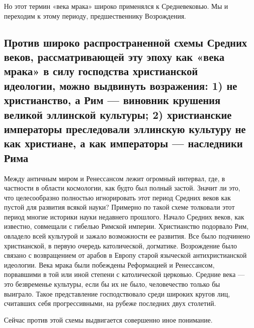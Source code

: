 Но этот  термин «века мрака»  широко применялся к Средневековью.  Мы и
переходим к этому периоду, предшественнику Возрождения.

\subsection{Против  широко   распространенной  схемы   Средних  веков,
рассматривающей  эту   эпоху  как  «века  мрака»   в  силу  господства
христианской   идеологии,   можно    выдвинуть   возражения:   1)   не
христианство, а Рим ---  виновник крушения великой эллинской культуры;
2)  христианские императоры  преследовали  эллинскую  культуру не  как
христиане, а как императоры --- наследники Рима}

Между  античным  миром и  Ренессансом  лежит  огромный интервал,  где,
в  частности  в  области  космологии, как  будто  был  полный  застой.
Значит ли  это, что  целесообразно полностью игнорировать  этот период
Средних  веков  как пустой  для  развития  всякой науки?  Примерно  по
такой  схеме толковали  этот  период многие  историки науки  недавнего
прошлого.  Начало Средних  веков,  как известно,  совмещали с  гибелью
Римской империи. Христианство подорвало Рим, овладело всей культурой и
зажало  возможности ее  развития. Все  было подчинено  христианской, в
первую  очередь католической,  догматике. Возрождение  было связано  с
возвращением  от арабов  в  Европу  старой языческой  антихристианской
идеологии.  Века  мрака  были  побеждены  Реформацией  и  Ренессансом,
порвавшими в  той или  иной степени  с католической  церковью. Средние
века ---  это безвременье культуры,  если бы их не  было, человечество
только бы  выиграло. Такое представление господствовало  среди широких
кругов лиц,  считавших себя  прогрессивными, на рубеже  последних двух
столетий.

Сейчас против этой схемы выдвигается совершенно иное понимание.

